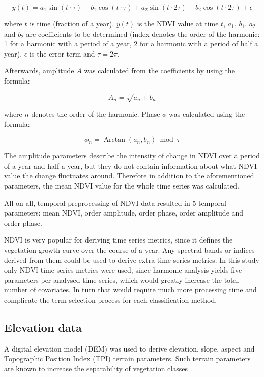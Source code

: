 \documentclass[a4paper,12pt]{scrbook}
\DeclareMathOperator{\Arctan}{Arctan}
\begin{document}
$$ y(t) = a_1 \sin{(t\cdot{\tau{}})} + b_1 \cos{(t\cdot{\tau{}})} + a_2 \sin{(t\cdot{2\tau{}})} + b_2 \cos{(t\cdot{2\tau{}})} + \epsilon{} $$

where $t$ is time (fraction of a year), $y(t)$ is the NDVI value at time $t$, $a_1$, $b_1$, $a_2$ and $b_2$ are coefficients to be determined (index denotes the order of the harmonic: 1 for a harmonic with a period of a year, 2 for a harmonic with a period of half a year), $\epsilon{}$ is the error term and $\tau{} = 2\pi{}$.

Afterwards, amplitude $A$ was calculated from the coefficients by using the formula:

$$ A_n = \sqrt{a_n + b_n} $$

where $n$ denotes the order of the harmonic. Phase $\phi{}$ was calculated using the formula:

$$ \phi{}_n = \Arctan{(a_n, b_n)} \bmod{\tau{}} $$

The amplitude parameters describe the intensity of change in NDVI over a period of a year and half a year, but they do not contain information about what NDVI value the change fluctuates around. Therefore in addition to the aforementioned parameters, the mean NDVI value for the whole time series was calculated.

All on all, temporal preprocessing of NDVI data resulted in 5 temporal parameters: mean NDVI,  order amplitude,  order phase,  order amplitude and  order phase.

NDVI is very popular for deriving time series metrics, since it defines the vegetation growth curve over the course of a year. Any spectral bands or indices derived from them could be used to derive extra time series metrics. In this study only NDVI time series metrics were used, since harmonic analysis yields five parameters per analysed time series, which would greatly increase the total number of covariates. In turn that would require much more processing time and complicate the term selection process for each classification method.

\subsection{Elevation data}

A digital elevation model (DEM) was used to derive elevation, slope, aspect and Topographic Position Index (TPI) terrain parameters. Such terrain parameters are known to increase the separability of vegetation classes \citep{burrough2001fuzzy}.
\end{document}
